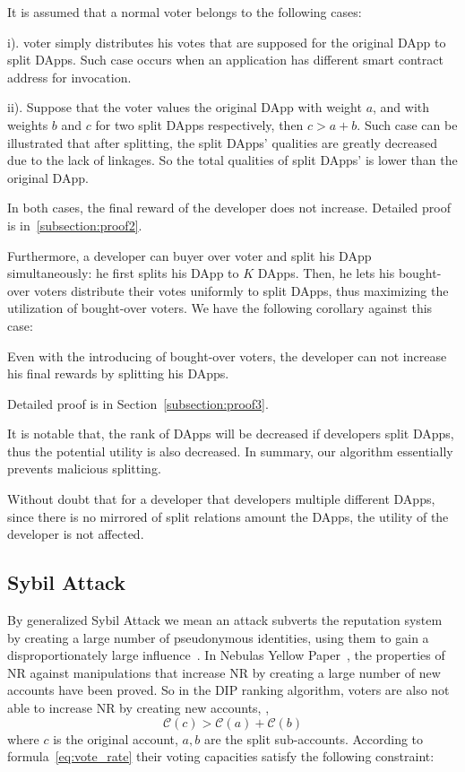 It is assumed that a normal voter belongs to the following cases:
\begin{inparaenum}
\item[i).] voter simply distributes his votes that are supposed for the original DApp to split DApps. Such case occurs when an application has different smart contract address for invocation.
\item[ii).] Suppose that the voter values the original DApp with weight $a$, and with weights $b$ and $c$ for two split DApps respectively, then $c>a+b$. Such case can be illustrated that after splitting, the split DApps' qualities are greatly decreased due to the lack of linkages. So the total qualities of split DApps' is lower than the original DApp.
 \end{inparaenum}

  In both cases, the final reward of the developer does not increase. Detailed proof  is in~\ref{subsection:proof2}.

Furthermore, a developer can buyer over voter and split his DApp simultaneously: he first splits his DApp to $K$ DApps. Then, he lets his bought-over voters distribute their votes uniformly to split DApps, thus  maximizing the utilization of  bought-over  voters. We have the following corollary against this case:

\begin{corollary}
	\label{c1}
	Even with the introducing of bought-over voters, the developer can not increase his final rewards by splitting his DApps.
\end{corollary}

Detailed proof is in Section~\ref{subsection:proof3}.

It is notable that, the rank of DApps will be decreased if developers split DApps, thus the potential utility is also decreased. In summary, our algorithm essentially prevents malicious splitting.

Without doubt that for a developer that developers multiple different  DApps, since there is no mirrored of split relations amount the DApps, the utility of the developer is not affected.

\subsection{Sybil Attack}
\noindent By generalized Sybil Attack we mean an attack subverts the reputation system by creating a large number of pseudonymous identities, using them to gain a disproportionately large influence~\cite{quercia2010sybil}. In Nebulas Yellow Paper~\cite{Nebulasyellowpaper}, the properties of NR against manipulations that increase NR by creating a large number of new accounts have been proved. So in the DIP ranking algorithm, voters are also not able to increase NR by creating new accounts, \ie,
$$\mathcal{C}(c)>\mathcal{C}(a)+\mathcal{C}(b)$$
where $c$ is the original account, $a,b$ are the split sub-accounts. According to formula~\ref{eq:vote_rate} their voting capacities satisfy the following constraint:

